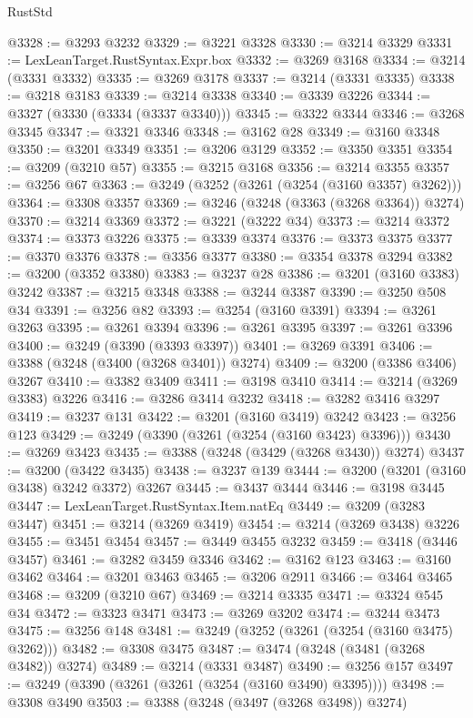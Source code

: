 \begin{lexlean}{RustStd}
\begin{coremodule}
@3328 := @3293 @3232
@3329 := @3221 @3328
@3330 := @3214 @3329
@3331 := LexLeanTarget.RustSyntax.Expr.box
@3332 := @3269 @3168
@3334 := @3214 (@3331 @3332)
@3335 := @3269 @3178
@3337 := @3214 (@3331 @3335)
@3338 := @3218 @3183
@3339 := @3214 @3338
@3340 := @3339 @3226
@3344 := @3327 (@3330 (@3334 (@3337 @3340)))
@3345 := @3322 @3344
@3346 := @3268 @3345
@3347 := @3321 @3346
@3348 := @3162 @28
@3349 := @3160 @3348
@3350 := @3201 @3349
@3351 := @3206 @3129
@3352 := @3350 @3351
@3354 := @3209 (@3210 @57)
@3355 := @3215 @3168
@3356 := @3214 @3355
@3357 := @3256 @67
@3363 := @3249 (@3252 (@3261 (@3254 (@3160 @3357) @3262)))
@3364 := @3308 @3357
@3369 := @3246 (@3248 (@3363 (@3268 @3364)) @3274)
@3370 := @3214 @3369
@3372 := @3221 (@3222 @34)
@3373 := @3214 @3372
@3374 := @3373 @3226
@3375 := @3339 @3374
@3376 := @3373 @3375
@3377 := @3370 @3376
@3378 := @3356 @3377
@3380 := @3354 @3378 @3294
@3382 := @3200 (@3352 @3380)
@3383 := @3237 @28
@3386 := @3201 (@3160 @3383) @3242
@3387 := @3215 @3348
@3388 := @3244 @3387
@3390 := @3250 @508 @34
@3391 := @3256 @82
@3393 := @3254 (@3160 @3391)
@3394 := @3261 @3263
@3395 := @3261 @3394
@3396 := @3261 @3395
@3397 := @3261 @3396
@3400 := @3249 (@3390 (@3393 @3397))
@3401 := @3269 @3391
@3406 := @3388 (@3248 (@3400 (@3268 @3401)) @3274)
@3409 := @3200 (@3386 @3406) @3267
@3410 := @3382 @3409
@3411 := @3198 @3410
@3414 := @3214 (@3269 @3383) @3226
@3416 := @3286 @3414 @3232
@3418 := @3282 @3416 @3297
@3419 := @3237 @131
@3422 := @3201 (@3160 @3419) @3242
@3423 := @3256 @123
@3429 := @3249 (@3390 (@3261 (@3254 (@3160 @3423) @3396)))
@3430 := @3269 @3423
@3435 := @3388 (@3248 (@3429 (@3268 @3430)) @3274)
@3437 := @3200 (@3422 @3435)
@3438 := @3237 @139
@3444 := @3200 (@3201 (@3160 @3438) @3242 @3372) @3267
@3445 := @3437 @3444
@3446 := @3198 @3445
@3447 := LexLeanTarget.RustSyntax.Item.natEq
@3449 := @3209 (@3283 @3447)
@3451 := @3214 (@3269 @3419)
@3454 := @3214 (@3269 @3438) @3226
@3455 := @3451 @3454
@3457 := @3449 @3455 @3232
@3459 := @3418 (@3446 @3457)
@3461 := @3282 @3459 @3346
@3462 := @3162 @123
@3463 := @3160 @3462
@3464 := @3201 @3463
@3465 := @3206 @2911
@3466 := @3464 @3465
@3468 := @3209 (@3210 @67)
@3469 := @3214 @3335
@3471 := @3324 @545 @34
@3472 := @3323 @3471
@3473 := @3269 @3202
@3474 := @3244 @3473
@3475 := @3256 @148
@3481 := @3249 (@3252 (@3261 (@3254 (@3160 @3475) @3262)))
@3482 := @3308 @3475
@3487 := @3474 (@3248 (@3481 (@3268 @3482)) @3274)
@3489 := @3214 (@3331 @3487)
@3490 := @3256 @157
@3497 := @3249 (@3390 (@3261 (@3261 (@3254 (@3160 @3490) @3395))))
@3498 := @3308 @3490
@3503 := @3388 (@3248 (@3497 (@3268 @3498)) @3274)

\end{coremodule}
\end{lexlean}

